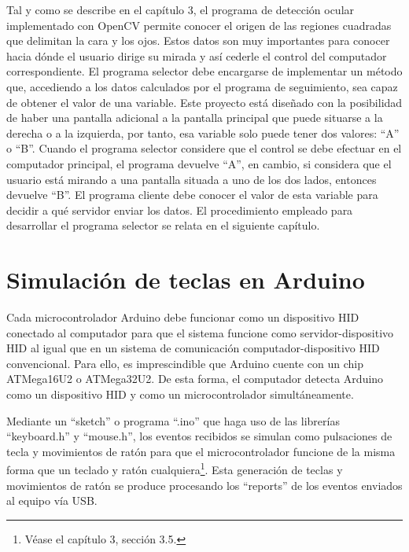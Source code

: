 Tal y como se describe en el capítulo 3, el programa de detección ocular implementado con OpenCV permite conocer el origen de las regiones cuadradas que delimitan la cara y los ojos. Estos datos son muy importantes para conocer hacia dónde el usuario dirige su mirada y así cederle el control del computador correspondiente. El programa selector debe encargarse de implementar un método que, accediendo a los datos calculados por el programa de seguimiento, sea capaz de obtener el valor de una variable. Este proyecto está diseñado con la posibilidad de haber una pantalla adicional a la pantalla principal que puede situarse a la derecha o a la izquierda, por tanto, esa variable solo puede tener dos valores: ``A'' o ``B''. Cuando el programa selector considere que el control se debe efectuar en el computador principal, el programa devuelve ``A'', en cambio, si considera que el usuario está mirando a una pantalla situada a uno de los dos lados, entonces devuelve ``B''. El programa cliente debe conocer el valor de esta variable para decidir a qué servidor enviar los datos. El procedimiento empleado para desarrollar el programa selector se relata en el siguiente capítulo.




\clearpage

\section{Simulación de teclas en Arduino} \label{s2_5}

Cada microcontrolador Arduino debe funcionar como un dispositivo HID conectado al computador para que el sistema funcione como servidor-dispositivo HID al igual que en un sistema de comunicación computador-dispositivo HID convencional. Para ello, es imprescindible que Arduino cuente con un chip ATMega16U2 o ATMega32U2. De esta forma, el computador detecta Arduino como un dispositivo HID y como un microcontrolador simultáneamente.

Mediante un ``sketch'' o programa ``.ino'' que haga uso de las librerías ``keyboard.h'' y ``mouse.h'', los eventos recibidos se simulan como pulsaciones de tecla y movimientos de ratón para que el microcontrolador funcione de la misma forma que un teclado y ratón cualquiera\footnote{Véase el capítulo 3, sección 3.5.}. Esta generación de teclas y movimientos de ratón se produce procesando los ``reports'' de los eventos enviados al equipo vía USB.

